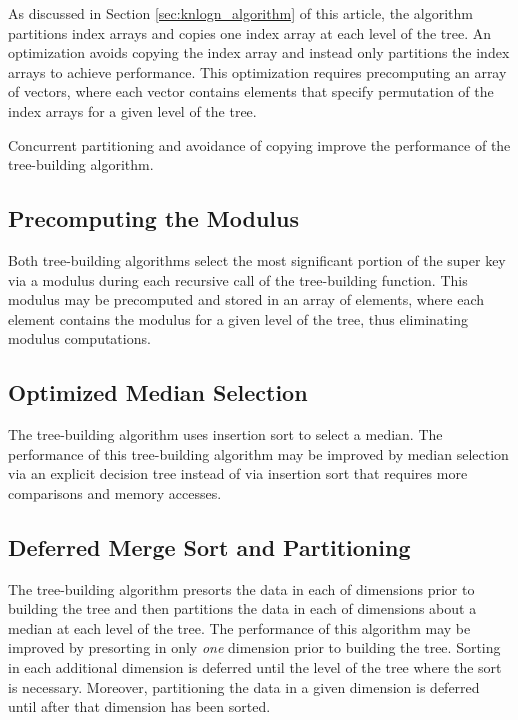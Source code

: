 \documentclass{sig-alternate}
\begin{document}
As discussed in Section \ref{sec:knlogn_algorithm} of this article, the  algorithm partitions  index arrays and copies one index array at each level of the tree.  An optimization avoids copying the index array and instead only partitions the  index arrays to achieve  performance. This optimization requires precomputing an array of  vectors, where each vector contains  elements that specify permutation of the index arrays for a given level of the tree.

 Concurrent partitioning and avoidance of copying improve the performance of the  tree-building algorithm.

\subsection{Precomputing the Modulus}

Both tree-building algorithms select the most significant portion of the super key via a modulus during each recursive call of the tree-building function. This modulus may be precomputed and stored in an array of  elements, where each element contains the modulus for a given level of the tree, thus eliminating  modulus computations.

\subsection{Optimized Median Selection}

The  tree-building algorithm uses insertion sort \cite{Bentley2} to select a median. The performance of this tree-building algorithm may be improved by median selection via an explicit decision tree \cite{Stepanov} instead of via insertion sort that requires more comparisons and memory accesses.

\subsection{Deferred Merge Sort and Partitioning}

The  tree-building algorithm presorts the data in each of  dimensions prior to building the tree and then partitions the data in each of  dimensions about a median at each level of the tree. The performance of this algorithm may be improved by presorting in only \emph{one} dimension prior to building the tree.  Sorting in each additional dimension is deferred until the level of the tree where the sort is necessary. Moreover, partitioning the data in a given dimension is deferred until after that dimension has been sorted.
\end{document}
